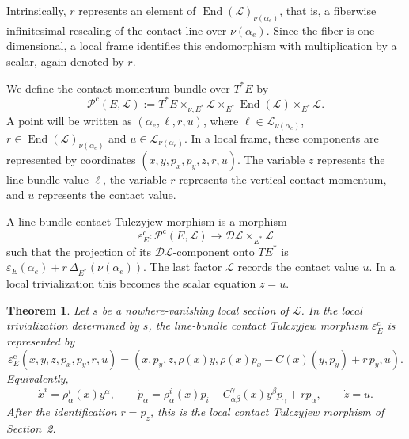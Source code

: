 \documentclass[11pt]{article}
\newtheorem{theorem}{Theorem}[section]
\newcommand{\mc}[1]{\mathcal{#1}}
\newcommand{\Lbundle}{\mathcal{L}}
\begin{document}
Intrinsically, \(r\) represents an element of
\(\operatorname{End}(\Lbundle)_{\nu(\alpha_e)}\), that is, a fiberwise infinitesimal
rescaling of the contact line over \(\nu(\alpha_e)\). Since the fiber is
one-dimensional, a local frame identifies this endomorphism with multiplication
by a scalar, again denoted by \(r\).

We define the contact momentum bundle over \(T^*E\) by
\[
\mc P^{\mathrm c}(E,\Lbundle)
:=
T^*E\times_{\nu,E^*}\Lbundle
\times_{E^*}\operatorname{End}(\Lbundle)
\times_{E^*}\Lbundle.
\]
A point will be written as \((\alpha_e,\ell,r,u)\), where
$\ell\in\Lbundle_{\nu(\alpha_e)}$, $r\in\operatorname{End}(\Lbundle)_{\nu(\alpha_e)}$ and 
$u\in\Lbundle_{\nu(\alpha_e)}$.
In a local frame, these components are represented by coordinates
$(x,y,p_x,p_y,z,r,u)$. The variable \(z\) represents the line-bundle value \(\ell\), the variable \(r\)
represents the vertical contact momentum, and \(u\) represents the contact value.

A line-bundle contact Tulczyjew morphism is a morphism
\[
\varepsilon_E^{\mathrm c}:
\mc P^{\mathrm c}(E,\Lbundle)
\longrightarrow
\mathcal D\Lbundle\times_{E^*}\Lbundle
\]
such that the projection of its \(\mathcal D\Lbundle\)-component onto \(TE^*\) is
$\varepsilon_E(\alpha_e)+r\,\Delta_{E^*}(\nu(\alpha_e))$. The last factor \(\Lbundle\) records the contact value \(u\). In a local
trivialization this becomes the scalar equation \(\dot z=u\).

\begin{theorem}
\label{thm:global-local-contact}
Let \(s\) be a nowhere-vanishing local section of \(\Lbundle\). In the local trivialization determined
by \(s\), the line-bundle contact Tulczyjew morphism
\(\varepsilon_E^{\mathrm c}\) is represented by
\begin{equation}
\varepsilon_E^{\mathrm c}(x,y,z,p_x,p_y,r,u)
=
\left(
x,p_y,z,
\rho(x)y,
\rho(x)p_x-C(x)(y,p_y)+r\,p_y,
u
\right).
\label{eq:global-local-epsc}
\end{equation}
Equivalently,
\[
\dot x^i=\rho^i_\alpha(x)y^\alpha,\qquad
\dot p_\alpha
=
\rho^i_\alpha(x)p_i
-
C^\gamma_{\alpha\beta}(x)y^\beta p_\gamma
+
r p_\alpha,\qquad
\dot z=u.
\]
After the identification \(r=p_z\), this is the local contact Tulczyjew morphism
of Section~2.
\end{theorem}
\end{document}
